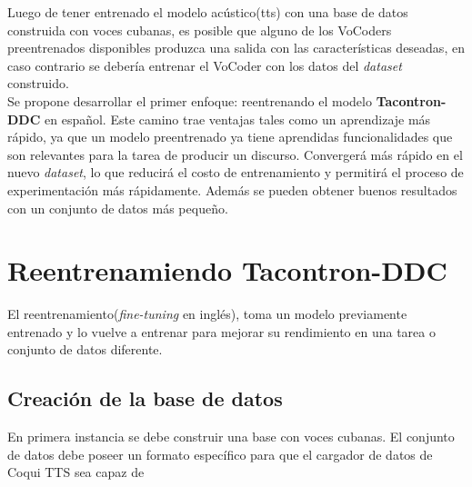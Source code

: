 Luego de tener entrenado el modelo acústico(tts) con una base de datos construida con voces cubanas, es posible que alguno de los VoCoders preentrenados disponibles produzca una salida con las características deseadas, en caso contrario se debería entrenar el VoCoder con los datos del \textit{dataset} construido.\\

Se propone desarrollar el primer enfoque: reentrenando el modelo \textbf{Tacontron-DDC} en español. Este camino trae ventajas tales como un aprendizaje más rápido, ya que un modelo preentrenado ya tiene aprendidas funcionalidades que son relevantes para la tarea de producir un discurso. Convergerá más rápido en el nuevo \textit{dataset}, lo que reducirá el costo de entrenamiento y permitirá el proceso de experimentación más rápidamente. Además se pueden obtener buenos resultados con un conjunto de datos más pequeño.  

\section{Reentrenamiendo Tacontron-DDC}

El reentrenamiento(\textit{fine-tuning} en inglés), toma un modelo previamente entrenado y lo vuelve a entrenar para mejorar su rendimiento en una tarea o conjunto de datos diferente.

\subsection{Creación de la base de datos}

En primera instancia se debe construir una base con voces cubanas. El conjunto de datos debe poseer un formato específico para que el cargador de datos de Coqui TTS sea capaz de   

           











	





